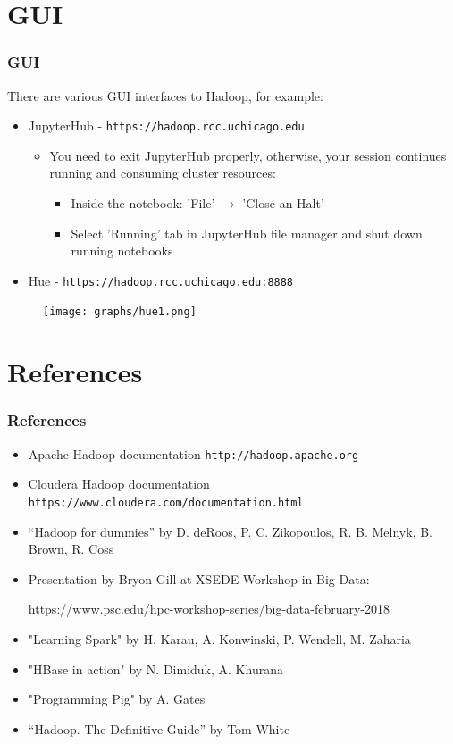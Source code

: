 \documentclass{beamer}
\begin{document}
\section{GUI}
\begin{frame}[fragile]
  \frametitle{GUI}
  There are various GUI interfaces to Hadoop, for example:
  \begin{itemize}
  \item JupyterHub - {\color{mycolorcli}\verb|https://hadoop.rcc.uchicago.edu|}
    \begin{itemize}
    \item You need to exit JupyterHub properly, otherwise, your session continues running and consuming cluster resources:
      \begin{itemize}
        \item Inside the notebook: 'File' $\rightarrow$  'Close an Halt'
        \item Select 'Running' tab in JupyterHub file manager and shut down running notebooks
      \end{itemize}
    \end{itemize}
    \item Hue - {\color{mycolorcli}\verb|https://hadoop.rcc.uchicago.edu:8888|}
    \end{itemize}
 \begin{figure}[h]
 \texttt{[image: graphs/hue1.png]}
 \end{figure}

\end{frame}


\section{References}
\begin{frame}[fragile]
 \frametitle{References}
 \begin{itemize}
 \item Apache Hadoop documentation {\color{mycolorcli}\verb|http://hadoop.apache.org|}
 \item Cloudera Hadoop documentation {\color{mycolorcli}\verb|https://www.cloudera.com/documentation.html|}
  \item ``Hadoop for dummies'' by D. deRoos, P. C. Zikopoulos, R. B. Melnyk, B. Brown, R. Coss
  \item Presentation by Bryon Gill at XSEDE Workshop in Big Data: 
{\color{mycolorcli}
  \begin{verbnobox}[\small]
https://www.psc.edu/hpc-workshop-series/big-data-february-2018
  \end{verbnobox}
}
  \item "Learning Spark" by H. Karau, A. Konwinski, P. Wendell, M. Zaharia
  \item "HBase in action" by N. Dimiduk, A. Khurana
  \item "Programming Pig" by A. Gates
  \item ``Hadoop. The Definitive Guide'' by Tom White
 \end{itemize}

\end{frame}
\end{document}
